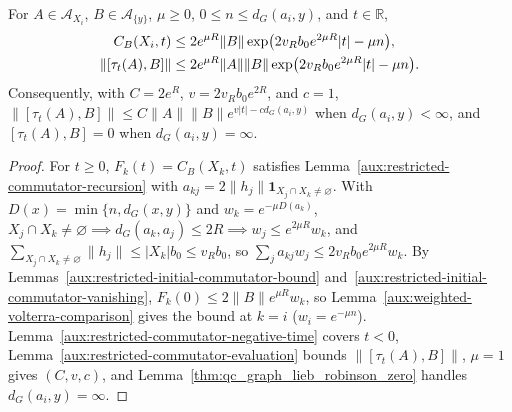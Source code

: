 \begin{lemma}
    \label{thm:qc_graph_lieb_robinson}
    \leanok
    For $A\in\mathcal A_{X_i}$, $B\in\mathcal A_{\{y\}}$, $\mu\geq0$, $0\leq n\leq d_G(a_i,y)$, and $t\in\mathbb R$,
    \begin{align}
        C_B(X_i,t)        & \leq 2e^{\mu R}\|B\|
        \exp\bigl(2v_Rb_0e^{2\mu R}|t|-\mu n\bigr),\notag \\
        \|[\tau_t(A),B]\| & \leq 2e^{\mu R}\|A\|\|B\|
        \exp\bigl(2v_Rb_0e^{2\mu R}|t|-\mu n\bigr).\notag
    \end{align}
    Consequently, with $C=2e^R$, $v=2v_Rb_0e^{2R}$, and $c=1$, $\|[\tau_t(A),B]\|\leq C\|A\|\|B\|e^{v|t|-cd_G(a_i,y)}$ when $d_G(a_i,y)<\infty$, and $[\tau_t(A),B]=0$ when $d_G(a_i,y)=\infty$.
\end{lemma}
\begin{proof}\leanok
    For $t\ge0$, $F_k(t)=C_B(X_k,t)$ satisfies Lemma~\ref{aux:restricted-commutator-recursion} with $a_{kj}=2\|h_j\|\mathbf 1_{X_j\cap X_k\ne\varnothing}$. With $D(x)=\min\{n,d_G(x,y)\}$ and $w_k=e^{-\mu D(a_k)}$, $X_j\cap X_k\ne\varnothing\implies d_G(a_k,a_j)\le2R\implies w_j\le e^{2\mu R}w_k$, and $\sum_{X_j\cap X_k\ne\varnothing}\|h_j\|\le|X_k|b_0\le v_Rb_0$, so $\sum_j a_{kj}w_j\le 2v_Rb_0e^{2\mu R}w_k$. By Lemmas~\ref{aux:restricted-initial-commutator-bound} and~\ref{aux:restricted-initial-commutator-vanishing}, $F_k(0)\le 2\|B\|e^{\mu R}w_k$, so Lemma~\ref{aux:weighted-volterra-comparison} gives the bound at $k=i$ ($w_i=e^{-\mu n}$). Lemma~\ref{aux:restricted-commutator-negative-time} covers $t<0$, Lemma~\ref{aux:restricted-commutator-evaluation} bounds $\|[\tau_t(A),B]\|$, $\mu=1$ gives $(C,v,c)$, and Lemma~\ref{thm:qc_graph_lieb_robinson_zero} handles $d_G(a_i,y)=\infty$.
\end{proof}

